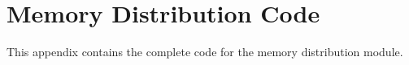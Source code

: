 \chapter{Memory Distribution Code} \label{App:MemoryDistributionCode}

This appendix contains the complete code for the memory distribution module.

